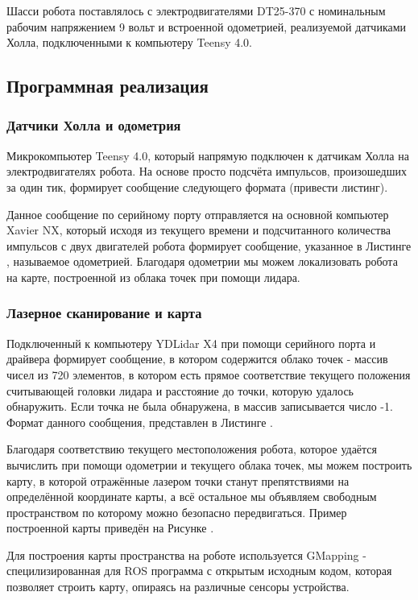 \documentclass[12pt,a4paper]{scrartcl}
\begin{document}
				Шасси робота поставлялось с электродвигателями DT25-370 с номинальным рабочим напряжением 9 вольт и встроенной одометрией, реализуемой датчиками Холла, подключенными к компьютеру Teensy 4.0\cite{bib:DT25-370Desc}.
			\subsection{Программная реализация}
				\subsubsection{Датчики Холла и одометрия}
					Микрокомпьютер Teensy 4.0, который напрямую подключен к датчикам Холла на электродвигателях робота. На основе просто подсчёта импульсов, произошедших за один тик, формирует сообщение следующего формата (привести листинг).
					
					
					Данное сообщение по серийному порту отправляется на основной компьютер Xavier NX, который исходя из текущего времени и подсчитанного количества импульсов с двух двигателей робота формирует сообщение, указанное в Листинге , называемое одометрией.
					Благодаря одометрии мы можем локализовать робота на карте, построенной из облака точек при помощи лидара.
				\subsubsection{Лазерное сканирование и карта}
					Подключенный к компьютеру YDLidar X4 при помощи серийного порта и драйвера формирует сообщение, в котором содержится облако точек - массив чисел из 720 элементов, в котором есть прямое соответствие текущего положения считывающей головки лидара и расстояние до точки, которую удалось обнаружить. Если точка не была обнаружена, в массив записывается число -1. Формат данного сообщения, представлен в Листинге .
					
					Благодаря соответствию текущего местоположения робота, которое удаётся вычислить при помощи одометрии и текущего облака точек, мы можем построить карту, в которой отражённые лазером точки станут препятствиями на определённой координате карты, а всё остальное мы объявляем свободным пространством по которому можно безопасно передвигаться. Пример построенной карты приведён на Рисунке . 
					
					Для построения карты пространства на роботе используется GMapping - специлизированная для ROS программа с открытым исходным кодом, которая позволяет строить карту, опираясь на различные сенсоры устройства.
					
\end{document}
